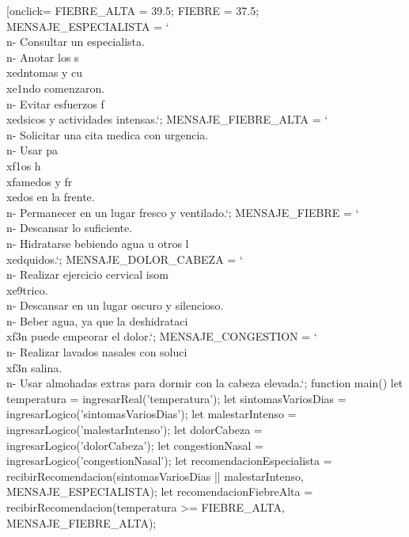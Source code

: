 \documentclass{article}
\begin{document}
{    \begin{Form}
    \PushButton[onclick={
        FIEBRE_ALTA = 39.5;
        FIEBRE      = 37.5;
        MENSAJE_ESPECIALISTA = `
            \\n- Consultar un especialista.
            \\n- Anotar los s\\xedntomas y cu\\xe1ndo comenzaron.
            \\n- Evitar esfuerzos f\\xedsicos y actividades intensas.`;
        MENSAJE_FIEBRE_ALTA = `
            \\n- Solicitar una cita medica con urgencia.
            \\n- Usar pa\\xf1os h\\xfamedos y fr\\xedos en la frente.
            \\n- Permanecer en un lugar fresco y ventilado.`;
        MENSAJE_FIEBRE = `
            \\n- Descansar lo suficiente.
            \\n- Hidratarse bebiendo agua u otros l\\xedquidos.`;
        MENSAJE_DOLOR_CABEZA = `
            \\n- Realizar ejercicio cervical isom\\xe9trico.
            \\n- Descansar en un lugar oscuro y silencioso.
            \\n- Beber agua, ya que la deshidrataci\\xf3n puede empeorar el dolor.`;
        MENSAJE_CONGESTION = `
            \\n- Realizar lavados nasales con soluci\\xf3n salina.
            \\n- Usar almohadas extras para dormir con la cabeza elevada.`;       
        function main() {
            let temperatura = ingresarReal('temperatura');
            let sintomasVariosDias = ingresarLogico('sintomasVariosDias');
            let malestarIntenso = ingresarLogico('malestarIntenso');
            let dolorCabeza = ingresarLogico('dolorCabeza');
            let congestionNasal = ingresarLogico('congestionNasal');
            let recomendacionEspecialista = recibirRecomendacion(sintomasVariosDias || malestarIntenso, MENSAJE_ESPECIALISTA);
	        let recomendacionFiebreAlta = recibirRecomendacion(temperatura >= FIEBRE_ALTA, MENSAJE_FIEBRE_ALTA);
}}
\end{Form}}
\end{document}
